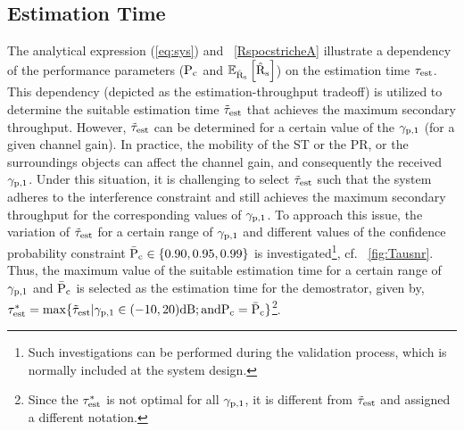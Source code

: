\subsection{Estimation Time}
\label{esttime}
The analytical expression (\ref{eq:sys}) and \figurename~\ref{RspocstricheA} illustrate a dependency of the performance parameters ($\text{P}_{\text{c}}$ and ${\mathbb E}_{\hat{\text{{R}}}_{\text{s}}}\left[ \hat{\text{{R}}}_{\text{s}} \right]$) on the estimation time $\tau_{\text{est}}$. This dependency (depicted as the estimation-throughput tradeoff) is utilized to determine the suitable estimation time $\tilde{\tau}_{\text{est}}$ that achieves the maximum secondary throughput. However, $\tilde{\tau}_{\text{est}}$ can be determined for a certain value of the ${\gamma}_{\text{p,1}}$ (for a given channel gain). In practice, the mobility of the ST or the PR, or the surroundings objects can affect the channel gain, and consequently the received ${\gamma}_{\text{p,1}}$. Under this situation, it is challenging to select $\tilde{\tau}_{\text{est}}$ such that the system adheres to the interference constraint and still achieves the maximum secondary throughput for the corresponding values of ${\gamma}_{\text{p,1}}$. To approach this issue, the variation of $\tilde{\tau}_{\text{est}}$ for a certain range of ${\gamma}_{\text{p,1}}$ and different values of the confidence probability constraint $\bar{\text{P}}_{\text{c}} \in \{0.90, 0.95, 0.99\}$ is investigated\footnote{Such investigations can be performed during the validation process, which is normally included at the system design.}, cf. \figurename~\ref{fig:Tausnr}. %
Thus, the maximum value of the suitable estimation time for a certain range of ${\gamma}_{\text{p,1}}$ and $\bar{\text{P}}_{\text{c}}$ is selected as the estimation time for the demostrator, given by, ${\tau}^*_{\text{est}} = \operatorname*{max}\{ \tilde{\tau}_{\text{est}} | {\gamma}_{\text{p,1}} \in (-10,20 )\SI{}{dB}; \text{and} \text{P}_{\text{c}} = \bar{\text{P}}_{\text{c}} \}$\footnote{Since the ${\tau}^*_{\text{est}}$ is not optimal for all ${\gamma}_{\text{p,1}}$, it is different from $\tilde{\tau}_{\text{est}}$ and assigned a different notation.}.  
